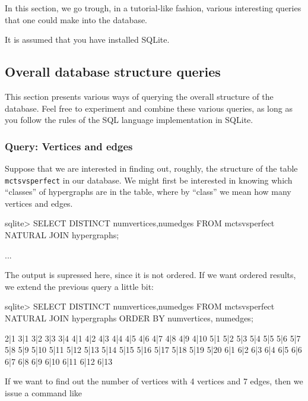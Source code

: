 In this section, we go trough, in a tutorial-like fashion, various interesting queries that one could make into the database.

It is assumed that you have installed SQLite.

\subsection{Overall database structure queries}

This section presents various ways of querying the overall structure of the database.
Feel free to experiment and combine these various queries, as long as you follow the rules of the SQL language implementation in SQLite.

\subsubsection{Query: Vertices and edges}

Suppose that we are interested in finding out, roughly, the structure of the table \texttt{mctsvsperfect} in our database.
We might first be interested in knowing which ``classes'' of hypergraphs are in the table, where by ``class'' we mean how many vertices and edges.



\begin{code}

sqlite> SELECT DISTINCT numvertices,numedges
        FROM mctsvsperfect NATURAL JOIN hypergraphs;

...

\end{code}

The output is supressed here, since it is not ordered.
If we want ordered results, we extend the previous query a little bit:


\begin{code}

sqlite> SELECT DISTINCT numvertices,numedges
        FROM mctsvsperfect NATURAL JOIN hypergraphs
        ORDER BY numvertices, numedges;

2|1
3|1
3|2
3|3
3|4
4|1
4|2
4|3
4|4
4|5
4|6
4|7
4|8
4|9
4|10
5|1
5|2
5|3
5|4
5|5
5|6
5|7
5|8
5|9
5|10
5|11
5|12
5|13
5|14
5|15
5|16
5|17
5|18
5|19
5|20
6|1
6|2
6|3
6|4
6|5
6|6
6|7
6|8
6|9
6|10
6|11
6|12
6|13


\end{code}


If we want to find out the number of vertices with 4 vertices and 7 edges, then we issue a command like

